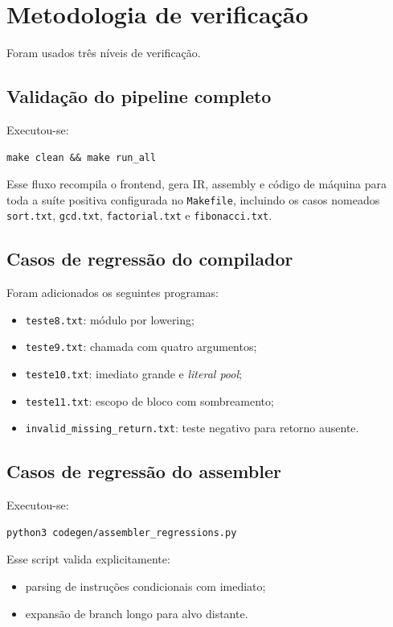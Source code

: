 \documentclass[12pt,a4paper]{article}
\begin{document}
\section{Metodologia de verificação}
Foram usados três níveis de verificação.

\subsection{Validação do pipeline completo}
Executou-se:
\begin{verbatim}
make clean && make run_all
\end{verbatim}
Esse fluxo recompila o frontend, gera IR, assembly e código de máquina para toda a suíte positiva configurada no \texttt{Makefile}, incluindo os casos nomeados \texttt{sort.txt}, \texttt{gcd.txt}, \texttt{factorial.txt} e \texttt{fibonacci.txt}.

\subsection{Casos de regressão do compilador}
Foram adicionados os seguintes programas:
\begin{itemize}[leftmargin=1.5em]
    \item \texttt{teste8.txt}: módulo por lowering;
    \item \texttt{teste9.txt}: chamada com quatro argumentos;
    \item \texttt{teste10.txt}: imediato grande e \emph{literal pool};
    \item \texttt{teste11.txt}: escopo de bloco com sombreamento;
    \item \texttt{invalid\_missing\_return.txt}: teste negativo para retorno ausente.
\end{itemize}

\subsection{Casos de regressão do assembler}
Executou-se:
\begin{verbatim}
python3 codegen/assembler_regressions.py
\end{verbatim}
Esse script valida explicitamente:
\begin{itemize}[leftmargin=1.5em]
    \item parsing de instruções condicionais com imediato;
    \item expansão de branch longo para alvo distante.
\end{itemize}
\end{document}
